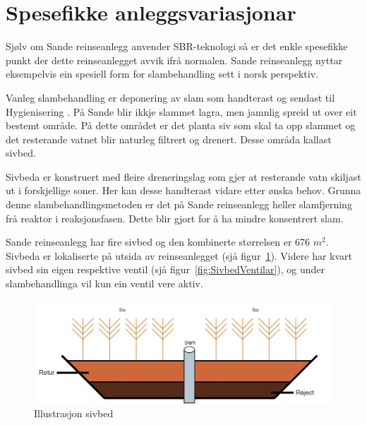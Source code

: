 \newpage
\section{Spesefikke anleggsvariasjonar}
\thispagestyle{fancy}

Sjølv om Sande reinseanlegg anvender \gls{SBR}-teknologi så er det enkle spesefikke
punkt der dette reinseanlegget avvik ifrå normalen. 
Sande reinseanlegg nyttar eksempelvis ein spesiell form for slambehandling sett i norsk perspektiv.

Vanleg slambehandling er deponering av slam som handterast og sendast til \gls{Hygienisering} \citep{Slam}.
På Sande blir ikkje slammet lagra, men jamnlig spreid ut over eit bestemt område. På dette området er
det planta siv som skal ta opp slammet og det resterande vatnet blir naturleg filtrert og drenert.
Desse områda kallast sivbed.

Sivbeda er konstruert med fleire dreneringslag som gjer at resterande vatn skiljast ut i forskjellige soner.
Her kan desse handterast vidare etter ønska behov. 
Grunna denne slambehandlingsmetoden er det på Sande reinseanlegg heller slamfjerning frå reaktor
i reaksjonsfasen. Dette blir gjort for å ha mindre konsentrert slam.

Sande reinseanlegg har fire sivbed og den kombinerte størrelsen er 676 $m^2$. Sivbeda er lokaliserte på utsida av reinseanlegget (sjå figur~\ref{fig:Sivbed}).\newline
Videre har kvart sivbed sin eigen respektive ventil (sjå figur~\ref{fig:SivbedVentilar}), og under slambehandlinga vil kun ein ventil vere aktiv. 
 

\begin{figure}[htbp]
    \centering
    \includegraphics[width=1\textwidth]{Figurar/Sivbed.png}
    \caption{Illustrasjon sivbed}\label{fig:Sivbed}
\end{figure}

\newpage

